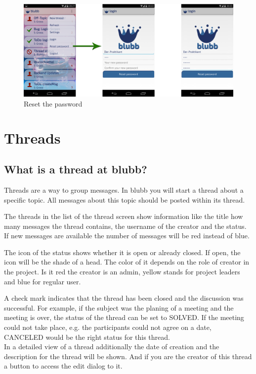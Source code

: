 \documentclass[12pt,a4paper,oneside]{report}
\newcommand{\appname}{blubb}
\begin{document}
\begin{figure}[!ht]
    \includegraphics[width=\linewidth]{ResetPW.png}
    \caption{Reset the password}
\end{figure}


\section{Threads}
\subsection{What is a thread at \appname{}?}
Threads are a way to group messages. In \appname{} you will start a thread about a specific topic. All messages about this topic should be posted within its thread. 

The threads in the list of the thread screen show information like the title how many messages the thread contains, the username of the creator and the status. If new messages are available the number of messages will be red instead of blue. 

The icon of the status shows whether it is open or already closed. If open, the icon will be the shade of a head. The color of it depends on the role of creator in the project. Is it red the creator is an admin, yellow stands for project leaders and blue for regular user.
 
A check mark indicates that the thread has been closed and the discussion was successful. For example, if the subject was the planing of a meeting and the meeting is over, the status of the thread can be set to SOLVED. 
If the meeting could not take place, e.g. the participants could not agree on a date, CANCELED would be the right status for this thread.
\\
In a detailed view of a thread additionally the date of creation and the description for the thread will be shown.
And if you are the creator of this thread a button to access the edit dialog to it.
\end{document}
